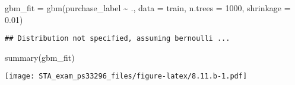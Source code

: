 \documentclass[
]{article}
\newenvironment{Shaded}{\begin{snugshade}}{\end{snugshade}}
\newcommand{\AttributeTok}[1]{\textcolor[rgb]{0.77,0.63,0.00}{#1}}
\newcommand{\DecValTok}[1]{\textcolor[rgb]{0.00,0.00,0.81}{#1}}
\newcommand{\FloatTok}[1]{\textcolor[rgb]{0.00,0.00,0.81}{#1}}
\newcommand{\FunctionTok}[1]{\textcolor[rgb]{0.00,0.00,0.00}{#1}}
\newcommand{\NormalTok}[1]{#1}
\newcommand{\OtherTok}[1]{\textcolor[rgb]{0.56,0.35,0.01}{#1}}
\newcommand{\SpecialCharTok}[1]{\textcolor[rgb]{0.00,0.00,0.00}{#1}}
\begin{document}
\begin{Shaded}
\begin{Highlighting}[]
\NormalTok{gbm\_fit }\OtherTok{=} \FunctionTok{gbm}\NormalTok{(purchase\_label }\SpecialCharTok{\textasciitilde{}}\NormalTok{ ., }\AttributeTok{data =}\NormalTok{ train, }\AttributeTok{n.trees =} \DecValTok{1000}\NormalTok{, }\AttributeTok{shrinkage =} \FloatTok{0.01}\NormalTok{)}
\end{Highlighting}
\end{Shaded}

\begin{verbatim}
## Distribution not specified, assuming bernoulli ...
\end{verbatim}

\begin{Shaded}
\begin{Highlighting}[]
\FunctionTok{summary}\NormalTok{(gbm\_fit)}
\end{Highlighting}
\end{Shaded}

\texttt{[image: STA\_exam\_ps33296\_files/figure-latex/8.11.b-1.pdf]}
\end{document}
